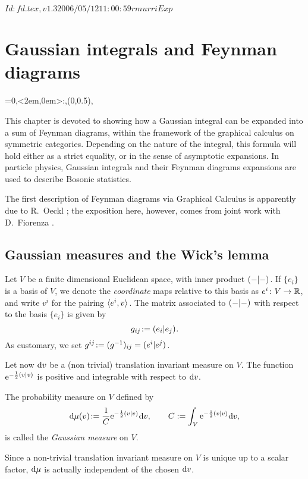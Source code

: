 \RCSID $Id: fd.tex,v 1.3 2006/05/12 11:00:59 rmurri Exp $


\chapter{Gaussian integrals and Feynman diagrams}
\label{sec:fd}
\everyxy={0,<2em,0em>:,(0,0.5),} %

This chapter is devoted to showing how a Gaussian integral can be
expanded into a sum of Feynman diagrams, within the framework of the
graphical calculus on symmetric categories.  Depending on the nature
of the integral, this formula will hold either as a strict equality,
or in the sense of asymptotic expansions. In particle physics,
Gaussian integrals and their Feynman diagrams expansions are used to
describe Bosonic statistics.

The first description of Feynman diagrams via Graphical Calculus is
apparently due to R.~Oeckl \cite{oeckl;braided-qft}; the exposition
here, however, comes from joint work with D.~Fiorenza
\cite{murri-fiorenza;feynman}. 


\section{Gaussian measures and the Wick's lemma} 

Let $V$ be a finite dimensional Euclidean space,
with inner product $( -|- )_{}$. If $\{e_i\}$ is a basis of
$V$, we denote the \emph{coordinate} maps relative to this basis as
$e^i\colon V\to\mathbb{R}$, and write $v^i$ for the pairing
$\langle e^i,v \rangle_{}$.  The matrix associated to $( -|- )_{}$ with
respect to the basis $\{e_i\}$ is given by
\begin{equation*}
  g_{ij} \joinrel:= \inner{e_i}{e_j}.
\end{equation*}
As customary, we set $g^{ij} \joinrel:= (g^{-1})_{ij} = \inner{e^i}{e^j}$.

Let now $\mathrm{d} v$ be a (non trivial) translation invariant measure on
$V$. The function $\mathrm{e}^{-\frac{1}{2}( v|v )_{}}$ is positive and
integrable with respect to $\mathrm{d} v$.
\begin{definition}\label{dfn:gaussian-measure}
  The probability measure on $V$ defined by
  \begin{equation*}
    \ud\mu(v) \joinrel:= \frac{1}{C} \E^{-\onehalf\inner{v}{v}} \ud v, 
    \qquad
    C := {\int_V \E^{-\onehalf\inner{v}{v}} \ud v},
  \end{equation*}
  is called the \emph{Gaussian measure} on $V$.
\end{definition}
Since a non-trivial translation invariant measure on $V$ is unique up
to a scalar factor, $\mathrm{d}\mu$ is actually independent of the chosen
$\mathrm{d} v$.

